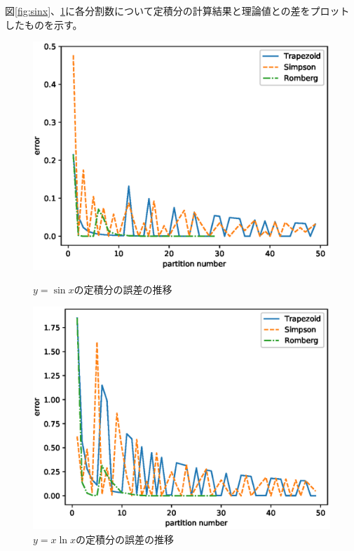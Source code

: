 \documentclass{jsarticle}
\begin{document}
        図\ref{fig:sinx}、\ref{fig:xlnx}に各分割数について定積分の計算結果と理論値との差をプロットしたものを示す。

        \begin{figure}[h]
            \begin{minipage}{0.5\hsize}
                \centering
                \includegraphics[width=1\hsize]{img/sinx.eps}
                \caption{$y = \sin x$の定積分の誤差の推移}
                \label{fig:sinx}
            \end{minipage}
            \begin{minipage}{0.5\hsize}
                \centering
                \includegraphics[width=1\hsize]{img/xlnx.eps}
                \caption{$y = x\ln x$の定積分の誤差の推移}
                \label{fig:xlnx}
            \end{minipage}
        \end{figure}
\end{document}

